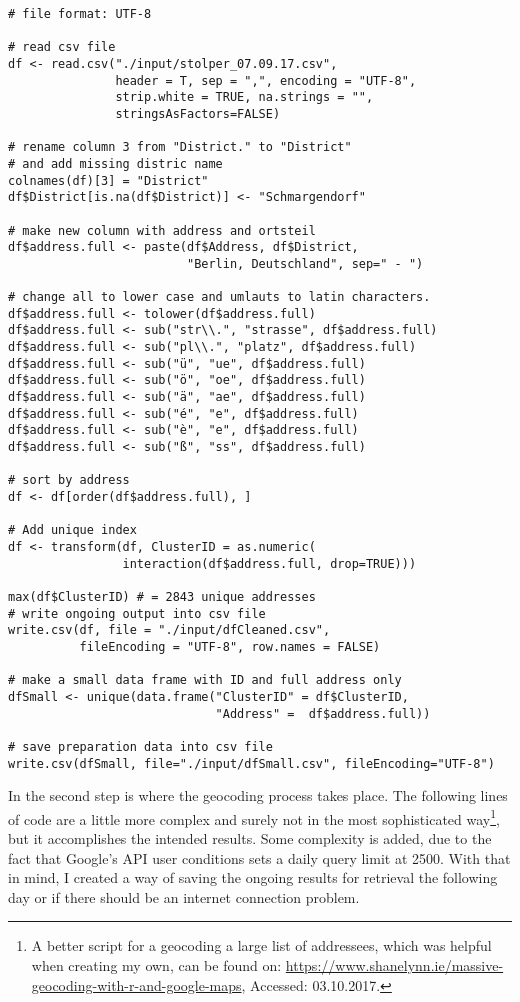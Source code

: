 \begin{lstlisting}[title=R code to geocode addresses (1), frame=single]
# file format: UTF-8

# read csv file 
df <- read.csv("./input/stolper_07.09.17.csv",
			   header = T, sep = ",", encoding = "UTF-8",
			   strip.white = TRUE, na.strings = "",
    		   stringsAsFactors=FALSE)

# rename column 3 from "District." to "District"
# and add missing distric name
colnames(df)[3] = "District"                          
df$District[is.na(df$District)] <- "Schmargendorf"

# make new column with address and ortsteil
df$address.full <- paste(df$Address, df$District,
						 "Berlin, Deutschland", sep=" - ")

# change all to lower case and umlauts to latin characters.
df$address.full <- tolower(df$address.full)
df$address.full <- sub("str\\.", "strasse", df$address.full)
df$address.full <- sub("pl\\.", "platz", df$address.full)
df$address.full <- sub("ü", "ue", df$address.full)
df$address.full <- sub("ö", "oe", df$address.full)
df$address.full <- sub("ä", "ae", df$address.full)
df$address.full <- sub("é", "e", df$address.full)
df$address.full <- sub("è", "e", df$address.full)
df$address.full <- sub("ß", "ss", df$address.full)

# sort by address 
df <- df[order(df$address.full), ]

# Add unique index
df <- transform(df, ClusterID = as.numeric(
				interaction(df$address.full, drop=TRUE)))
		
max(df$ClusterID) # = 2843 unique addresses
# write ongoing output into csv file
write.csv(df, file = "./input/dfCleaned.csv",
		  fileEncoding = "UTF-8", row.names = FALSE)

# make a small data frame with ID and full address only
dfSmall <- unique(data.frame("ClusterID" = df$ClusterID,
					 		 "Address" =  df$address.full))

# save preparation data into csv file
write.csv(dfSmall, file="./input/dfSmall.csv", fileEncoding="UTF-8")
\end{lstlisting}


In the second step is where the geocoding process takes place. The following lines of code are a little more complex and surely not in the most sophisticated way\footnote{A better script for a geocoding a large list of addressees, which was helpful when creating my own, can be found on: \url{https://www.shanelynn.ie/massive-geocoding-with-r-and-google-maps}, Accessed: 03.10.2017.}, but it accomplishes the intended results. Some complexity is added, due to the fact that Google's API user conditions sets a daily query limit at 2500. With that in mind, I created a way of saving the ongoing results for retrieval the following day or if there should be an internet connection problem.  

